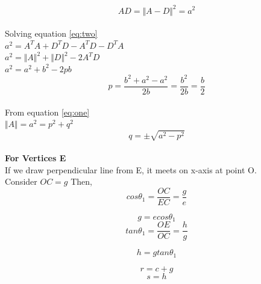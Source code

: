 \begin{enumerate}[label=\thesection.\arabic*.,ref=\thesection.\theenumi]
\begin{equation} \label{eq:two}
AD={\Vert A-D \Vert}^2=a^2
\end{equation}
\\
Solving equation \ref{eq:two}\\
$a^2=A^TA+D^TD-A^TD-D^TA$\\
$a^2={\Vert A\Vert}^2+{\Vert D\Vert}^2-2A^TD$\\
$a^2=a^2+b^2-2pb$\\
\begin{equation}
p=\frac{b^2+a^2-a^2}{2b}=\frac{b^2}{2b}=\frac{b}{2}
\end{equation}
\\
From equation \ref{eq:one}
\\
$\Vert A \Vert =a^2= p^2+q^2$\\
\begin{equation}
q=\pm \sqrt{a^2-p^2}
\end{equation}
\\
\textbf{For Vertices E}\\
If we draw perpendicular line from E, it meets on x-axis at point O.\\
Consider $OC =g$
Then, 
\begin{equation}
cos \theta _1 = \frac{OC}{EC}=\frac{g}{e}
\end{equation}

\begin{equation}
g = e cos\theta _1
\end{equation}
\begin{equation}
tan\theta _1=\frac{OE}{OC}=\frac{h}{g}
\end{equation}

\begin{equation}
h=gtan \theta _1
\end{equation}

\begin{equation}
r = c+g
\end{equation}
\begin{equation}
s = h
\end{equation}


\end{enumerate}
